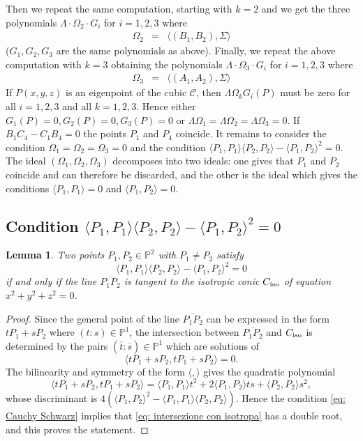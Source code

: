 \documentclass{amsart}
\theoremstyle{plain}
\newtheorem{lemma}[theorem]{Lemma}
\theoremstyle{definition}
\newcommand{\p}{\mathbb{P}}
\newcommand{\scl}[2]{\langle #1, #2 \rangle}
\begin{document}
Then we repeat the same computation, starting with $k=2$ and 
we get the three polynomials
$\Lambda \cdot \Omega_2 \cdot G_i$ for $i=1, 2, 3$
where
\begin{eqnarray}
\Omega_2 & = & \scl{(B_1, B_2)}{\Sigma}
\end{eqnarray}
($G_1, G_2, G_3$ are the same polynomials as above).
Finally, we repeat the above computation with $k=3$ obtaining the
polynomials
$\Lambda \cdot \Omega_3 \cdot G_i$ for $i=1, 2, 3$
where
\begin{eqnarray}
\Omega_3 & = & \scl{(A_1, A_2)}{\Sigma}
\end{eqnarray}
If $P(x, y, z)$ is an eigenpoint of the cubic $\mathcal{C}$, then
$\Lambda \Omega_k G_i(P)$ must be zero for all $i=1, 2, 3$ and all $k=1, 2, 3$.
Hence either $G_1(P)=0, G_2(P) = 0, G_3(P) = 0$ or
$\Lambda \Omega_1 = \Lambda \Omega_2 = \Lambda \Omega_3 = 0$. If 
$B_1C_4-C_1B_4 =0$ the points $P_1$ and $P_4$ coincide. It remains to consider
the condition $\Omega_1 = \Omega_2 = \Omega_3 = 0$ and the condition
$ \scl{P_1}{P_1} \scl{P_2}{P_2}-\scl{P_1}{P_2}^2 =0$. The ideal
$(\Omega_1, \Omega_2, \Omega_3)$ decomposes into two ideals: one gives that
$P_1$ and $P_2$ coincide and can therefore be discarded, and the other is
the ideal which gives the conditions $\scl{P_1}{P_1}=0$ and $\scl{P_1}{P_2}=0$.

\subsection{Condition $\scl{P_1}{P_1} \scl{P_2}{P_2}-\scl{P_1}{P_2}^2 = 0$}
\begin{lemma}\label{lemma: Cauchy Schwarz}
Two points $P_1, P_2 \in \p^2$ with $P_1 \neq P_2$ satisfy
\begin{equation}\label{eq: Cauchy Schwarz}
\scl{P_1}{P_1} \scl{P_2}{P_2}-\scl{P_1}{P_2}^2 = 0
\end{equation}
if and only if the line $\overline {P_1 P_2}$ is tangent to the isotropic conic
$C_{\rm iso}$ of equation $x^2 +y^2 +z^2=0$.
\end{lemma}

\begin{proof}
Since the general point of the line $\overline {P_1 P_2}$ can be expressed in the form
$t P_1 + sP_2$ where $(t:s) \in \p^1$, the intersection between $\overline {P_1 P_2}$
and $C_{\rm iso}$ is determined by the pairs $( \overline t: \overline s)\in \p^1$ which are solutions of
$$
\scl{t P_1 + sP_2}{t P_1 + sP_2} =0.
$$
The bilinearity and symmetry of the form $\scl{}{}$ gives the quadratic polynomial
\begin{equation}\label{eq: intersezione con isotropa}
\scl{t P_1 + sP_2}{t P_1 + sP_2}= \scl{P_1}{P_1} t^2
+2\scl{P_1}{P_2} ts + \scl{P_2}{P_2}s^2,
\end{equation}
whose discriminant is $4 ( \scl{P_1}{P_2}^2 - \scl{P_1}{P_1} \scl{P_2}{P_2})$.
Hence the condition \eqref{eq: Cauchy Schwarz} implies that \eqref{eq: intersezione con isotropa}
has a double root, and this proves the statement.
\end{proof}
\end{document}
